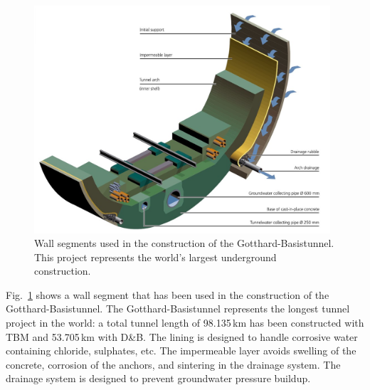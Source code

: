 \begin{figure}[htbp!]
\centering
\includegraphics[width=11cm]{./Sec_SiteInfra/Figures/tunnelwall.jpg}
\caption{Wall segments used in the construction of the Gotthard-Basistunnel.
This project represents the world's largest underground construction.}
\label{fig:tunnelwall}
\end{figure}
Fig.~\ref{fig:tunnelwall} shows a wall segment that has been used in
the construction of the Gotthard-Basistunnel. The Gotthard-Basistunnel
represents the longest tunnel project in the world: a total tunnel length
of 98.135\,km has been constructed with TBM and 53.705\,km with D\&B. 
The lining is designed to handle corrosive water containing chloride,
sulphates, etc. The impermeable layer avoids swelling of the concrete,
corrosion of the anchors, and sintering in the drainage system.
The drainage system is designed to prevent groundwater pressure buildup.

